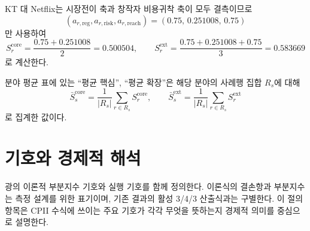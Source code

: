 \documentclass[11pt,a4paper]{report}
\begin{document}
KT 대 Netflix는 시장전이 축과 창작자 비용귀착 축이 모두 결측이므로
\[
\left(
a_{r,\mathrm{reg}},
a_{r,\mathrm{risk}},
a_{r,\mathrm{reach}}
\right)
=(0.75,\,0.251008,\,0.75)
\]
만 사용하여
\[
S^{\mathrm{core}}_r
=
\frac{0.75+0.251008}{2}
=
0.500504,
\qquad
S^{\mathrm{ext}}_r
=
\frac{0.75+0.251008+0.75}{3}
=
0.583669
\]
로 계산한다.

분야 평균 표에 있는 ``평균 핵심'', ``평균 확장''은 해당 분야의 사례행 집합 \(R_s\)에 대해
\[
\bar{S}^{\mathrm{core}}_s
=
\frac{1}{|R_s|}\sum_{r\in R_s} S^{\mathrm{core}}_r,
\qquad
\bar{S}^{\mathrm{ext}}_s
=
\frac{1}{|R_s|}\sum_{r\in R_s} S^{\mathrm{ext}}_r
\]
로 집계한 값이다.

\section{기호와 경제적 해석}
광의 이론적 부분지수 기호와 실행 기호를 함께 정의한다. 이론식의 결손항과 부분지수는 측정 설계를 위한 표기이며, 기존 결과의 활성 3/4/3 산출식과는 구별한다.
이 절의 항목은 CPII 수식에 쓰이는 주요 기호가 각각 무엇을 뜻하는지 경제적 의미를 중심으로 설명한다.
\begingroup
\small
\end{document}
